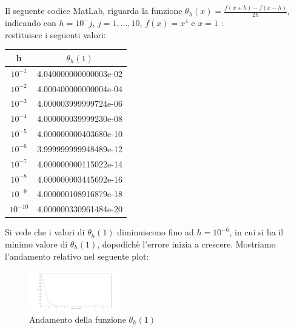 Il seguente codice MatLab, riguarda la funzione $\theta_{h}(x) = \frac{f(x+h)-f(x-h)}{2h}$, indicando con $h=10^-j$, $j=1,...,10$, $f(x)=x^4$ e $x=1$ :\\

restituisce i seguenti valori:\\
\begin{center}
\begin{tabular}{|c|c|}
\hline
h & \( \theta_{h}(1) \)  \\
\hline
    \(10^{-1}\) & 4.040000000000003e-02\\
    \(10^{-2}\) & 4.000400000000004e-04\\
    \(10^{-3}\) & 4.000003999999724e-06\\
    \(10^{-4}\) & 4.000000039999230e-08\\
    \(10^{-5}\) & 4.000000000403680e-10\\
    \(10^{-6}\) & 3.999999999948489e-12\\
    \(10^{-7}\) & 4.000000000115022e-14\\
    \(10^{-8}\) & 4.000000003445692e-16\\
    \(10^{-9}\) & 4.000000108916879e-18\\
    \(10^{-10}\) & 4.000000330961484e-20\\
\hline
\end{tabular}
\end{center} 
Si vede che i valori di $\theta_{h}(1)$ diminuiscono fino ad $h = 10^{-6}$, in cui si ha il minimo valore di $\theta_{h}(1)$, dopodichè l'errore inizia a crescere. Mostriamo l'andamento relativo nel seguente plot:
\begin{figure}[H]
\label{Cap_1_Es_3}
\includegraphics[left, width=150px]{Plot/Cap_1_Es_3}
\caption{Andamento della funzione $\theta_{h}(1)$}
\end{figure}
